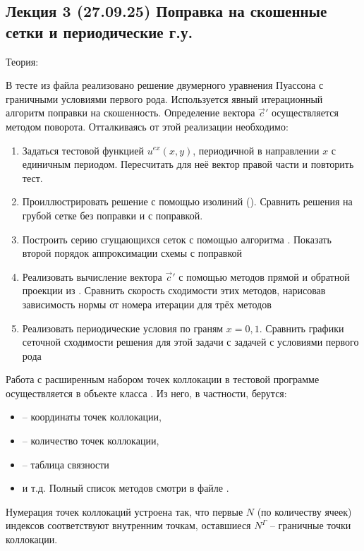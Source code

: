 \subsection{Лекция 3 (27.09.25) Поправка на скошенные сетки и периодические г.у.}
Теория: 

В тесте  из файла 
реализовано решение двумерного уравнения Пуассона с граничными условиями первого рода.
Используется явный итерационный алгоритм поправки на скошенность.
Определение вектора $\vec c'$ осуществляется методом поворота.
Отталкиваясь от этой реализации необходимо:
\begin{enumerate}
\item Задаться тестовой функцией $u^{ex}(x, y)$, периодичной в направлении $x$ с единичным периодом. Пересчитать для неё вектор правой части и повторить тест.
\item Проиллюстрировать решение с помощью изолиний (). Сравнить решения на грубой сетке без поправки и с поправкой.
\item Построить серию сгущающихся сеток с помощью алгоритма . Показать второй порядок аппроксимации схемы с поправкой
\item Реализовать вычисление вектора $\vec c'$ с помощью методов прямой и обратной проекции из .
      Сравнить скорость сходимости этих методов, нарисовав зависимость нормы от номера итерации для трёх методов
\item Реализовать периодические условия по граням $x=0,1$. Сравнить графики сеточной сходимости решения для этой задачи с задачей с условиями первого рода
\end{enumerate}

Работа с расширенным набором точек коллокации в тестовой программе
осуществляется в объекте  класса .
Из него, в частности, берутся:
\begin{itemize}
\item {} -- координаты точек коллокации,
\item {} -- количество точек коллокации,
\item {} -- таблица связности 
\item и т.д. Полный список методов смотри в файле .
\end{itemize}

Нумерация точек коллокаций устроена так, что первые $N$ (по количеству ячеек) индексов соответствуют внутренним точкам,
оставшиеся $N^\Gamma$ -- граничные точки коллокации.

